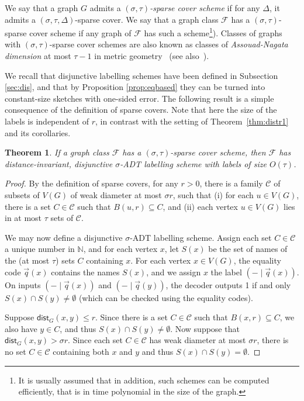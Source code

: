 \documentclass[11pt]{article}
\newtheorem{thm}{Theorem}[section]
\theoremstyle{definition}
\renewcommand{\leq}{\leqslant}
\def\F {{\mathcal F}}
\def\bN{{\mathbb N}}
\newcommand{\dist}{\mathsf{dist}}
\begin{document}
We say that a graph $G$ admits a \emph{$(\sigma, \tau)$-sparse cover
  scheme} if for any $\Delta$, it admits a $(\sigma, \tau, \Delta)$-sparse
cover. We say that a graph class $\F$ has a $(\sigma, \tau)$-sparse cover
  scheme if any graph of $\F$ has such a scheme\footnote{It
    is usually assumed that in addition, such schemes can be computed
    efficiently, that is in time polynomial in the size of the
    graph.}). Classes of graphs with $(\sigma, \tau)$-sparse cover
  schemes are also known as classes of \emph{Assouad-Nagata dimension} at
most $\tau-1$ in metric geometry~\cite{As82} (see also~\cite{LS05}).  



 We recall that
disjunctive labelling schemes have been defined in Subsection
\ref{sec:dis}, and that by Proposition \ref{prop:eqbased} they can be
turned into constant-size sketches with one-sided error. The following result is a simple consequence of the definition of
 sparse covers. Note
that here the size of the labels is independent of $r$, in contrast with the setting of
Theorem~\ref{thm:distr1} and its corollaries. 

\begin{thm}\label{thm:SCdist}
If a graph class $\F$ has  a $(\sigma, \tau)$-sparse cover
scheme, then $\mathcal{F}$ has distance-invariant, disjunctive $\sigma$-ADT
labelling scheme with labels of size  $O(\tau)$.
\end{thm}




\begin{proof}
By the definition of sparse covers, for any $r>0$, there is a family
$\mathcal{C}$ of
subsets of $V(G)$ of weak diameter at most $\sigma r$, such that (i) for each $u\in V(G)$, there is a set
$C\in \mathcal{C}$ such that $B(u,r)\subseteq C$, and (ii)
each vertex $u\in V(G)$ lies in at most $\tau$ sets of $\mathcal{C}$.

We may now define a disjunctive $\sigma$-ADT labelling scheme. Assign
each set $C \in \mathcal{C}$ a unique number in $\bN$, and for each
vertex $x$, let $S(x)$ be the set of names of the (at most
$\tau$) sets $C$ containing $x$.  For each vertex
$x \in V(G)$, the equality code $\vec q(x)$ contains the names $S(x)$, and we assign $x$ the label $(- \mid \vec q(x))$. On inputs $(- \mid \vec q(x))$ and $(- \mid \vec q(y))$, the decoder outputs 1 if and
only $S(x)\cap S(y)\ne \emptyset$ (which can be checked using the equality codes).

Suppose $\dist_G(x,y) \leq r$. Since there is a set $C\in \mathcal{C}$
such that $B(x,r)\subseteq C$, we also have $y\in C$, and thus
$S(x)\cap S(y)\ne \emptyset$. Now suppose that $\dist_G(x,y) > \sigma
r $. Since each set $C\in \mathcal{C}$ has weak diameter at most
$\sigma r$, there is no set $C\in \mathcal{C}$ containing both $x$ and
$y$ and thus $S(x)\cap S(y)=\emptyset$.
\end{proof}
\end{document}
